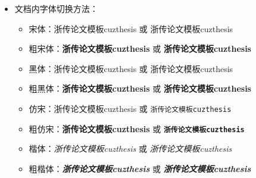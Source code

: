\begin{itemize}
\begin{itemize}
            \item 正文行距：启用和设置 \verb|\linespread{1.5}|，默认1.5倍行距。
            \item 参考文献行距：修改 \verb|\setlength{\bibsep}{0.0ex}|
            \item 目录显示级数：修改 \verb|\setcounter{tocdepth}{2}|
            \item 文档超链接的颜色及其显示：修改 \verb|\hypersetup|
        \end{itemize}
    \item 文档内字体切换方法：
        \begin{itemize}
            \item 宋体：浙传论文模板cuzthesis 或 \textrm{浙传论文模板cuzthesis}
            \item 粗宋体：{\bfseries 浙传论文模板cuzthesis} 或 \textbf{浙传论文模板cuzthesis}
            \item 黑体：{\sffamily 浙传论文模板cuzthesis} 或 \textsf{浙传论文模板cuzthesis}
            \item 粗黑体：{\bfseries\sffamily 浙传论文模板cuzthesis} 或 \textsf{\bfseries 浙传论文模板cuzthesis}
            \item 仿宋：{\ttfamily 浙传论文模板cuzthesis} 或 \texttt{浙传论文模板cuzthesis}
            \item 粗仿宋：{\bfseries\ttfamily 浙传论文模板cuzthesis} 或 \texttt{\bfseries 浙传论文模板cuzthesis}
            \item 楷体：{\itshape 浙传论文模板cuzthesis} 或 \textit{浙传论文模板cuzthesis}
            \item 粗楷体：{\bfseries\itshape 浙传论文模板cuzthesis} 或 \textit{\bfseries 浙传论文模板cuzthesis}
        \end{itemize}
\end{itemize}


